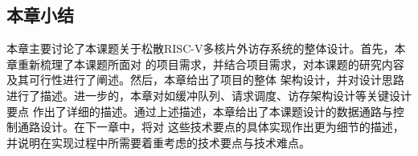 \subsection{本章小结}

本章主要讨论了本课题关于松散RISC-V多核片外访存系统的整体设计。首先，本章重新梳理了本课题所面对
的项目需求，并结合项目需求，对本课题的研究内容及其可行性进行了阐述。然后，本章给出了项目的整体
架构设计，并对设计思路进行了描述。进一步的，本章对如缓冲队列、请求调度、访存架构设计等关键设计要点
作出了详细的描述。通过上述描述，本章给出了本课题设计的数据通路与控制通路设计。在下一章中，将对
这些技术要点的具体实现作出更为细节的描述，并说明在实现过程中所需要着重考虑的技术要点与技术难点。
